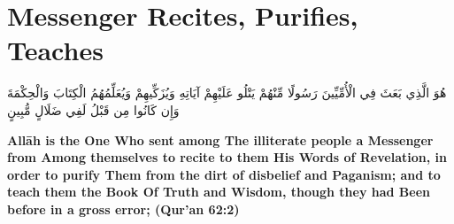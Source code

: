 \chapter{Messenger Recites, Purifies, Teaches}
\begin{center}
    {\Huge    
        \begin{Arabic}
            هُوَ الَّذِي بَعَثَ فِي الْأُمِّيِّينَ رَسُولًا مِّنْهُمْ يَتْلُو عَلَيْهِمْ آيَاتِهِ وَيُزَكِّيهِمْ وَيُعَلِّمُهُمُ الْكِتَابَ وَالْحِكْمَةَ وَإِن كَانُوا مِن قَبْلُ لَفِي ضَلَالٍ مُّبِينٍ
        \end{Arabic}
    }
\end{center}
\vspace*{\fill}
\vspace{3cm}
\begin{center}
    \large \textbf{Allāh is the One Who sent among The illiterate people a Messenger from Among themselves to recite to them His Words of Revelation, in order to purify Them from the dirt of disbelief and Paganism; and to teach them the Book Of Truth and Wisdom, though they had Been before in a gross error; (Qur'an 62:2)}
\end{center}
